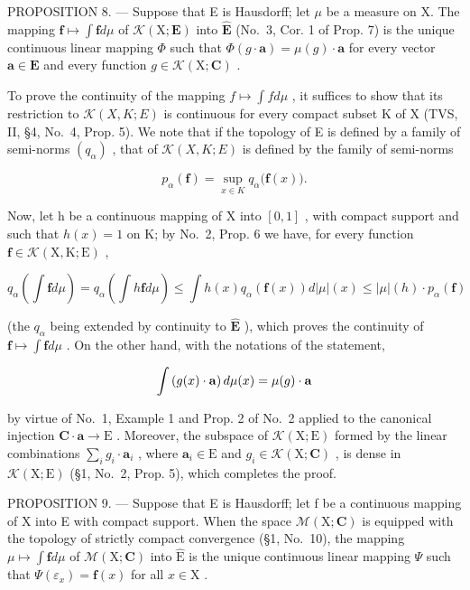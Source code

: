 PROPOSITION 8. --- Suppose that E is Hausdorff; let \(\mu\) be a measure on X. The mapping \(\mathbf{f} \mapsto \int \mathbf{f} d\mu\) of \(\mathcal{K}(\mathrm{X};\mathbf{E})\) into \(\widehat{\mathbf{E}}\) (No.~3, Cor. 1 of Prop. 7) is the unique continuous linear mapping \(\Phi\) such that \(\Phi(g \cdot \mathbf{a}) = \mu(g) \cdot \mathbf{a}\) for every vector \(\mathbf{a} \in \mathbf{E}\) and every function \(g \in \mathcal{K}(\mathrm{X};\mathbf{C})\) .

To prove the continuity of the mapping \(f \mapsto \int f d\mu\) , it suffices to show that its restriction to \(\mathcal{K}(X, K; E)\) is continuous for every compact subset K of X (TVS, II, §4, No.~4, Prop. 5). We note that if the topology of E is defined by a family of semi-norms \((q_{\alpha})\) , that of \(\mathcal{K}(X, K; E)\) is defined by the family of semi-norms

\[
p _ {\alpha} (\mathbf {f}) = \sup _ {x \in K} q _ {\alpha} \bigl (\mathbf {f} (x) \bigr).
\]

Now, let h be a continuous mapping of X into \([0,1]\) , with compact support and such that \(h(x)=1\) on K; by No.~2, Prop. 6 we have, for every function \(\mathbf{f}\in\mathcal{K}(\mathrm{X},\mathrm{K};\mathrm{E})\) ,

\[
q _ {\alpha} \left(\int \mathbf {f} d \mu\right) = q _ {\alpha} \left(\int h \mathbf {f} d \mu\right) \leqslant \int h (x) q _ {\alpha} (\mathbf {f} (x)) d | \mu | (x) \leqslant | \mu | (h) \cdot p _ {\alpha} (\mathbf {f})
\]

(the \(q_{\alpha}\) being extended by continuity to \(\widehat{\mathbf{E}}\) ), which proves the continuity of \(\mathbf{f} \mapsto \int \mathbf{f} d\mu\) . On the other hand, with the notations of the statement,

\[
\int \left(g (x) \cdot {\bf a}\right) d \mu (x) = \mu (g) \cdot {\bf a}
\]

by virtue of No.~1, Example 1 and Prop. 2 of No.~2 applied to the canonical injection \(\mathbf{C} \cdot \mathbf{a} \to \mathrm{E}\) . Moreover, the subspace of \(\mathcal{K}(\mathrm{X};\mathrm{E})\) formed by the linear combinations \(\sum_{i} g_i \cdot \mathbf{a}_i\) , where \(\mathbf{a}_i \in \mathrm{E}\) and \(g_i \in \mathcal{K}(\mathrm{X};\mathbf{C})\) , is dense in \(\mathcal{K}(\mathrm{X};\mathrm{E})\) (§1, No.~2, Prop. 5), which completes the proof.

PROPOSITION 9. --- Suppose that E is Hausdorff; let f be a continuous mapping of X into E with compact support. When the space \(\mathcal{M}(\mathrm{X};\mathbf{C})\) is equipped with the topology of strictly compact convergence (§1, No.~10), the mapping \(\mu \mapsto \int \mathbf{f} d\mu\) of \(\mathcal{M}(\mathrm{X};\mathbf{C})\) into \(\widehat{\mathrm{E}}\) is the unique continuous linear mapping \(\Psi\) such that \(\Psi(\varepsilon_x) = \mathbf{f}(x)\) for all \(x \in \mathrm{X}\) .

